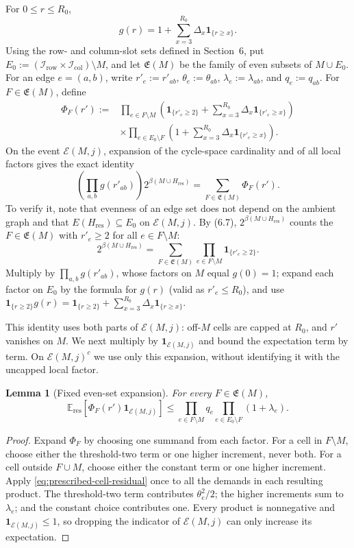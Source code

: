\documentclass[a4paper,10pt,reqno]{amsart}
\numberwithin{equation}{section}
\theoremstyle{plain}
\newtheorem{lemma}[theorem]{Lemma}
\theoremstyle{remark}
\begin{document}
For $0\le r\le R_0$,
\[
  g(r)=1+\sum_{x=3}^{R_0}\Delta_x\mathbf 1_{\{r\ge x\}}.
\]
Using the row- and column-slot sets defined in Section~6, put
$E_0:=(\mathcal I_{\mathrm{row}}\times\mathcal I_{\mathrm{col}})\setminus M$, and let
$\mathfrak E(M)$ be the family of even subsets of $M\cup E_0$. For an edge
$e=(a,b)$, write
$r'_e:=r'_{ab}$, $\theta_e:=\theta_{ab}$,
$\lambda_e:=\lambda_{ab}$, and $q_e:=q_{ab}$. For
$F\in\mathfrak E(M)$, define
\[
\begin{split}
  \Phi_F(r')
  :=
  &\prod_{e\in F\setminus M}
  \left(
    \mathbf 1_{\{r'_e\ge2\}}
    +
    \sum_{x=3}^{R_0}\Delta_x\mathbf 1_{\{r'_e\ge x\}}
  \right)\\
  &\times
  \prod_{e\in E_0\setminus F}
  \left(
    1+
    \sum_{x=3}^{R_0}\Delta_x\mathbf 1_{\{r'_e\ge x\}}
  \right).
\end{split}
\]
On the event $\mathcal E(M,j)$, expansion of the cycle-space
cardinality and of all local factors gives the exact identity
\[
  \left(\prod_{a,b}g(r'_{ab})\right)
  2^{\beta(M\cup H_{\mathrm{res}})}
  =
  \sum_{F\in\mathfrak E(M)}\Phi_F(r').
\]
To verify it, note that evenness of an edge set does not depend on the
ambient graph and that $E(H_{\mathrm{res}})\subseteq E_0$ on
$\mathcal E(M,j)$. By (6.7), $2^{\beta(M\cup H_{\mathrm{res}})}$ counts the
$F\in\mathfrak E(M)$ with $r'_e\ge2$ for all $e\in F\setminus M$:
\[
 2^{\beta(M\cup H_{\mathrm{res}})}
 =\sum_{F\in\mathfrak E(M)}\prod_{e\in F\setminus M}\mathbf 1_{\{r'_e\ge2\}}.
\]
Multiply by $\prod_{a,b}g(r'_{ab})$, whose factors on $M$ equal $g(0)=1$;
expand each factor on $E_0$ by the formula for $g(r)$ (valid as
$r'_e\le R_0$), and use
$\mathbf 1_{\{r\ge2\}}g(r)=\mathbf 1_{\{r\ge2\}}
+\sum_{x=3}^{R_0}\Delta_x\mathbf 1_{\{r\ge x\}}$.

This identity uses both parts of $\mathcal E(M,j)$: off-$M$ cells are
capped at $R_0$, and $r'$ vanishes on $M$. We next multiply by
$\mathbf 1_{\mathcal E(M,j)}$ and bound the expectation term by term.
On $\mathcal E(M,j)^c$ we use only this expansion,
without identifying it with the uncapped local factor.

\begin{lemma}[Fixed even-set expansion]
\label{lem:fixed-even-set-expansion}
For every $F\in\mathfrak E(M)$,
\[
  \mathbb E_{\mathrm{res}}\!\left[
    \Phi_F(r')\mathbf 1_{\mathcal E(M,j)}
  \right]
  \le
  \prod_{e\in F\setminus M}q_e
  \prod_{e\in E_0\setminus F}(1+\lambda_e).
\]
\end{lemma}

\begin{proof}
Expand $\Phi_F$ by choosing one summand from each factor. For a cell in
$F\setminus M$, choose either the threshold-two term or one higher
increment, never both. For a cell outside $F\cup M$, choose either the
constant term or one higher increment. Apply
\eqref{eq:prescribed-cell-residual} once to all the demands in each
resulting product. The threshold-two term contributes $\theta_e^2/2$;
the higher increments sum to $\lambda_e$; and the constant choice
contributes one. Every product is nonnegative and
$\mathbf 1_{\mathcal E(M,j)}\le1$, so dropping the indicator of
$\mathcal E(M,j)$ can only increase its expectation.
\end{proof}
\end{document}
